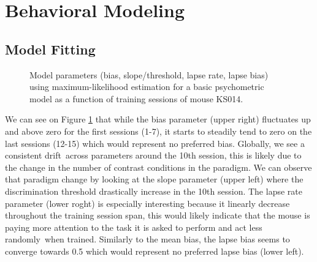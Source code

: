 \documentclass[paper=a4, fontsize=11pt]{scrartcl}
\numberwithin{equation}{section}		%
\numberwithin{figure}{section}			%
\numberwithin{table}{section}				%
\begin{document}
\section{Behavioral Modeling}
\subsection{Model Fitting}


\begin{figure}[!hbt]
\begin{center}
\end{center}
\caption{Model parameters (bias, slope/threshold, lapse rate, lapse bias) using maximum-likelihood estimation for a basic psychometric model as a function of training sessions of mouse KS014.}
\label{fig:param}
\end{figure}
We can see on Figure \ref{fig:param} that while the bias parameter (upper right) fluctuates up and above zero for the first sessions (1-7), it starts to steadily tend to zero on the last sessions (12-15) which would represent no preferred bias. Globally, we see a consistent \textquotesingle drift\textquotesingle\ across parameters around the 10th session, this is likely due to the change in the number of contrast conditions in the paradigm. We can observe that paradigm change by looking at the slope parameter (upper left) where the discrimination threshold drastically increase in the 10th session.  The lapse rate parameter (lower roght) is especially interesting because it linearly decrease throughout the training session span, this would likely indicate that the mouse is paying more attention to the task it is asked to perform and act less \textquotesingle randomly\textquotesingle\ when trained. Similarly to the mean bias, the lapse bias seems to converge towards 0.5 which would represent no preferred lapse bias (lower left).
\end{document}
